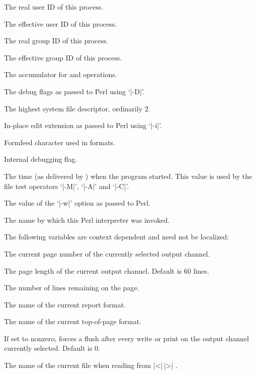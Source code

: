 \documentclass{refbase}
\begin{document}
\begin{enum}{1cm}
The real user ID of this process.

The effective user ID of this process. 

The real group ID of this process.

The effective group ID of this process.

The accumulator for  and  operations.

The debug flags as passed to Perl using `|-D|'.

The highest system file descriptor, ordinarily 2.

In-place edit extension as passed to Perl using `|-i|'.

Formfeed character used in formats.

Internal debugging flag.

The time (as delivered by ) when the program started. This
value is used by the file test operators `|-M|', `|-A|' and `|-C|'.

The value of the `|-w|' option as passed to Perl.

The name by which this Perl interpreter was invoked.

\end{enum}

The following variables are context dependent and need not be
localized:

\begin{enum}{1cm}

The current page number of the currently selected output channel.

The page length of the current output channel. Default is 60 lines.

The number of lines remaining on the page.

The name of the current report format.

The name of the current top-of-page format.

If set to nonzero, forces a flush after every write or print on the
output channel currently selected. Default is 0. 

The name of the current file when reading from |<|\,|>| .
\end{enum}
\end{document}
